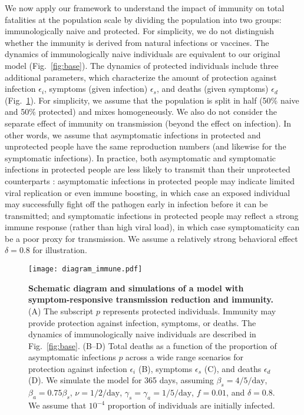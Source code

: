 \documentclass[12pt]{article}
\newcommand{\fref}[1]{Fig.~\ref{fig:#1}}
\begin{document}
We now apply our framework to understand the impact of immunity on total fatalities at the population scale by dividing the population into two groups: immunologically naive and protected.
For simplicity, we do not distinguish whether the immunity is derived from natural infections or vaccines.
The dynamics of immunologically naive individuals are equivalent to our original model (\fref{base}).
The dynamics of protected individuals include three additional parameters, which characterize the amount of protection against infection $\epsilon_i$, symptoms (given infection) $\epsilon_s$, and deaths (given symptoms) $\epsilon_d$ (\fref{immune}).
For simplicity, we assume that the population is split in half (50\% naive and 50\% protected) and mixes homogeneously. We also do not consider the separate effect of immunity on transmission (beyond the effect on infection). 
In other words, we assume that asymptomatic infections in protected and unprotected people have the same reproduction numbers (and likewise for the symptomatic infections).
In practice, both asymptomatic and symptomatic infections in protected people are less likely to transmit than their unprotected counterparts \citep{lipsitch2020understanding}: asymptomatic infections in protected people may indicate limited viral replication or even immune boosting, in which case an exposed individual may successfully fight off the pathogen early in infection before it can be transmitted; and symptomatic infections in protected people may reflect a strong immune response (rather than high viral load), in which case symptomaticity can be a poor proxy for transmission.
We assume a relatively strong behavioral effect $\delta=0.8$ for illustration.

\begin{figure}[!ht]
\texttt{[image: diagram\_immune.pdf]}
\caption{
\textbf{Schematic diagram and simulations of a model with symptom-responsive transmission reduction and immunity.}
(A) The subscript $p$ represents protected individuals. 
Immunity may provide protection against infection, symptoms, or deaths.
The dynamics of immunologically naive individuals are described in \fref{base}.
(B--D) Total deaths as a function of the proportion of asymptomatic infections $p$ across a wide range scenarios for protection against infection $\epsilon_i$ (B), symptoms $\epsilon_s$ (C), and deaths $\epsilon_d$ (D).
We simulate the model for 365 days, assuming $\beta_s = 4/5/\mathrm{day}$, $\beta_a = 0.75 \beta_s$, $\nu=1/2/\mathrm{day}$, $\gamma_s=\gamma_a=1/5/\mathrm{day}$, $f=0.01$, and $\delta=0.8$.
We assume that $10^{-4}$ proportion of individuals are initially infected.
}
\label{fig:immune}
\end{figure}
\end{document}
